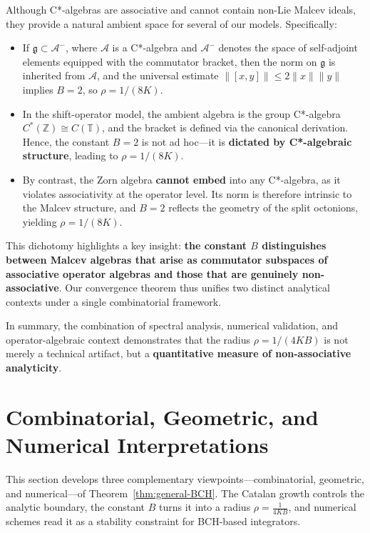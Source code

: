 \documentclass[11pt]{amsart}
\numberwithin{equation}{section}
\theoremstyle{remark}
\begin{document}
Although C*-algebras are associative and cannot contain non-Lie Malcev ideals, they provide a natural ambient space for several of our models. Specifically:\begin{itemize}
\item If $\mathfrak{g} \subset \mathcal{A}^-$, where $\mathcal{A}$ is a C*-algebra and $\mathcal{A}^-$ denotes the space of self-adjoint elements equipped with the commutator bracket, then the norm on $\mathfrak{g}$ is inherited from $\mathcal{A}$, and the universal estimate $\|[x,y]\| \leq 2\|x\|\|y\|$ implies $B = 2$, so $\rho = 1/(8K)$.

  \item In the shift-operator model, the ambient algebra is the group C*-algebra $C^*(\mathbb{Z}) \cong C(\mathbb{T})$, and the bracket is defined via the canonical derivation. Hence, the constant $B = 2$ is not ad hoc—it is \textbf{dictated by C*-algebraic structure}, leading to $\rho = 1/(8K)$.

  \item By contrast, the Zorn algebra \textbf{cannot embed} into any C*-algebra, as it violates associativity at the operator level. Its norm is therefore intrinsic to the Malcev structure, and $B = 2$ reflects the geometry of the split octonions, yielding $\rho = 1/(8K)$.\end{itemize}
This dichotomy highlights a key insight: \textbf{the constant $B$ distinguishes between Malcev algebras that arise as commutator subspaces of associative operator algebras and those that are genuinely non-associative}. Our convergence theorem thus unifies two distinct analytical contexts under a single combinatorial framework.



\medskip
\noindent
In summary, the combination of spectral analysis, numerical validation, and operator-algebraic context demonstrates that the radius $\rho = 1/(4KB)$ is not merely a technical artifact, but a \textbf{quantitative measure of non-associative analyticity}.

\section{Combinatorial, Geometric, and Numerical Interpretations}\label{sec:interpretations}

This section develops three complementary viewpoints—combinatorial, geometric, and numerical—of Theorem~\ref{thm:general-BCH}. The Catalan growth controls the analytic boundary, the constant $B$ turns it into a radius $\rho=\frac{1}{4KB}$, and numerical schemes read it as a stability constraint for BCH-based integrators.
\end{document}
